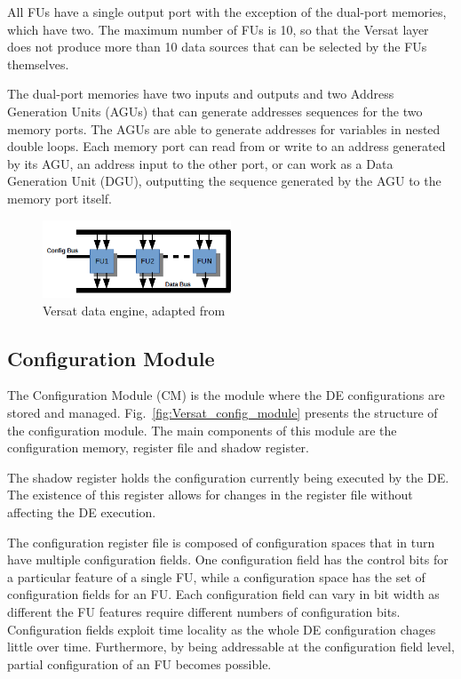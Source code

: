 All FUs have a single output port with the exception of the dual-port memories,
which have two. The maximum number of FUs is 10, so that the Versat layer does
not produce more than 10 data sources that can be selected by the FUs
themselves.

The dual-port memories have two inputs and outputs and two Address Generation
Units (AGUs) that can generate addresses sequences for the two memory ports. The
AGUs are able to generate addresses for variables in nested double loops. Each
memory port can read from or write to an address generated by its AGU, an
address input to the other port, or can work as a Data Generation Unit (DGU),
outputting the sequence generated by the AGU to the memory port itself.

\begin{figure}[!htb]
	\centering
	\includegraphics[width=0.5\textwidth]{Figures/versat_data_engine.png}
	\caption[Caption for figure in TOC.]{Versat data engine, adapted from~\cite{VMario:Deep_Versat}}
	\label{fig:Versat_data_engine}
\end{figure}


\subsection{Configuration Module}
\label{sec:versat_config_module}

The Configuration Module (CM) is the module where the DE configurations are
stored and managed. Fig.~\ref{fig:Versat_config_module} presents the structure
of the configuration module. The main components of this module are the
configuration memory, register file and shadow register.

The shadow register holds the configuration currently being executed by the
DE. The existence of this register allows for changes in the register file
without affecting the DE execution.

The configuration register file is composed of configuration spaces that in turn
have multiple configuration fields. One configuration field has the control bits
for a particular feature of a single FU, while a configuration space has the set
of configuration fields for an FU. Each configuration field can vary in bit
width as different the FU features require different numbers of configuration
bits. Configuration fields exploit time locality as the whole DE configuration
chages little over time. Furthermore, by being addressable at the configuration
field level, partial configuration of an FU becomes possible.

